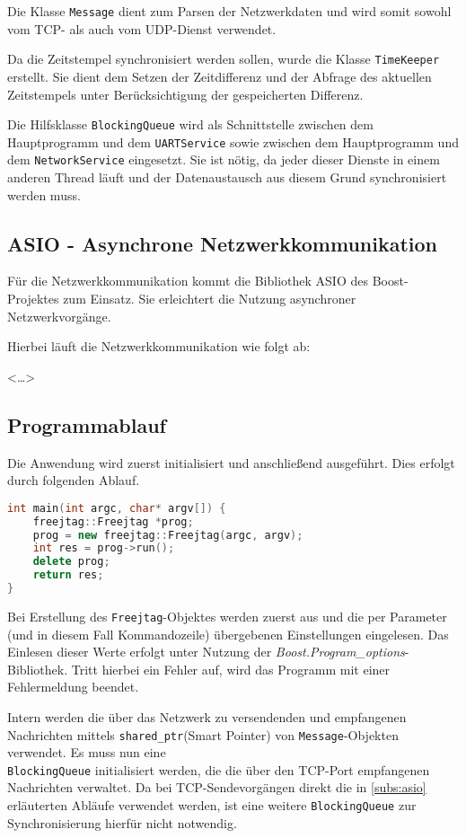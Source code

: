 Die Klasse \texttt{Message} dient zum Parsen der Netzwerkdaten und wird somit
sowohl vom TCP- als auch vom UDP-Dienst verwendet.

Da die Zeitstempel synchronisiert werden sollen, wurde die Klasse
\texttt{TimeKeeper} erstellt. Sie dient dem Setzen der Zeitdifferenz und der
Abfrage des aktuellen Zeitstempels unter Berücksichtigung der gespeicherten
Differenz.

Die Hilfsklasse \texttt{BlockingQueue} wird als Schnittstelle zwischen dem
Hauptprogramm und dem \texttt{UARTService} sowie zwischen dem Hauptprogramm
und dem \texttt{NetworkService} eingesetzt. Sie ist nötig, da jeder dieser
Dienste in einem anderen Thread läuft und der Datenaustausch aus diesem Grund
synchronisiert werden muss.

\subsection{ASIO - Asynchrone Netzwerkkommunikation}\label{subs:asio}
Für die Netzwerkkommunikation kommt die Bibliothek ASIO des Boost-Projektes zum
Einsatz. Sie erleichtert die Nutzung asynchroner Netzwerkvorgänge.

Hierbei läuft die Netzwerkkommunikation wie folgt ab:

<\ldots>
\subsection{Programmablauf}\label{subs:abl}
Die Anwendung wird zuerst initialisiert und anschließend ausgeführt. Dies
erfolgt durch folgenden Ablauf.
\begin{lstlisting}[language=C++]
int main(int argc, char* argv[]) {
    freejtag::Freejtag *prog;
    prog = new freejtag::Freejtag(argc, argv);
    int res = prog->run();
    delete prog;
    return res;
}
\end{lstlisting}
Bei Erstellung des \texttt{Freejtag}-Objektes werden zuerst aus
 und die per Parameter (und in diesem Fall
Kommandozeile) übergebenen Einstellungen eingelesen.
Das Einlesen dieser Werte erfolgt unter Nutzung der
\emph{Boost.Program\_options}-Bibliothek. Tritt hierbei ein Fehler auf, wird das
Programm mit einer Fehlermeldung beendet.

Intern werden die über das Netzwerk zu versendenden und empfangenen Nachrichten
mittels \texttt{shared\_ptr}(Smart Pointer) von \texttt{Message}-Objekten
verwendet. Es muss nun eine \\\texttt{BlockingQueue} initialisiert werden, die
die über den TCP-Port empfangenen Nachrichten verwaltet. Da bei
TCP-Sendevorgängen direkt die in \autoref{subs:asio} erläuterten Abläufe
verwendet werden, ist eine weitere \texttt{BlockingQueue} zur Synchronisierung
hierfür nicht notwendig.


